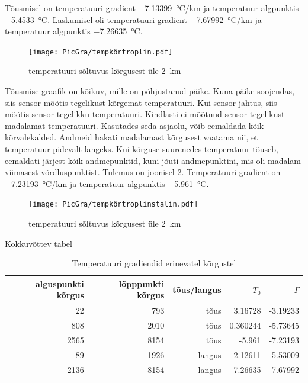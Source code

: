 \documentclass{trkut}%
\begin{document}
Tõusmisel on temperatuuri gradient \SI{-7.13399}{\degreeCelsius/km} ja temperatuur algpunktis \SI{-5.4533}{\celsius}. Laskumisel oli temperatuuri gradient \SI{-7.67992}{\degreeCelsius/km} ja temperatuur algpunktis \SI{-7.26635}{\celsius}.

\begin{figure}[h]
	\texttt{[image: PicGra/tempkõrtroplin.pdf]}
	\caption{temperatuuri sõltuvus kõrgusest üle \SI{2}{km}}
	\label{tempkõrtroplin}%
\end{figure}

Tõusmise graafik on kõikuv, mille on põhjustanud päike. Kuna päike soojendas, siis sensor mõõtis tegelikust kõrgemat temperatuuri. Kui sensor jahtus, siis mõõtis sensor tegelikku temperatuuri. Kindlasti ei mõõtnud sensor tegelikust madalamat temperatuuri. Kasutades seda asjaolu, võib eemaldada kõik kõrvalekalded. Andmeid hakati madalamast kõrgusest vaatama nii, et temperatuur pidevalt langeks. Kui kõrguse suurenedes temperatuur tõuseb, eemaldati järjest kõik andmepunktid, kuni jõuti andmepunktini, mis oli madalam viimasest võrdluspunktist. Tulemus on joonisel \ref{tempkõrtroplinstalin}. Temperatuuri gradient on \SI{-7.23193}{\degreeCelsius/km} ja temperatuur algpunktis \SI{-5.961}{\celsius}.

\begin{figure}[h]
	\texttt{[image: PicGra/tempkõrtroplinstalin.pdf]}
 	\caption{temperatuuri sõltuvus kõrgusest üle \SI{2}{km}}
 	\label{tempkõrtroplinstalin}%
\end{figure}

Kokkuvõttev tabel
\begin{table}[htb]
	\caption{Temperatuuri gradiendid erinevatel kõrgustel}
	\begin{tabular}{r|r|r|r|r}
		\hline
		alguspunkti kõrgus & lõpppunkti kõrgus & tõus/langus & $T_0$ & $\Gamma$ \\
		\hline
		22 & 793 & tõus & 3.16728 & -3.19233 \\
		808 & 2010 & tõus & 0.360244 & -5.73645 \\
		2565 & 8154 & tõus & -5.961 & -7.23193 \\
		89 & 1926 & langus & 2.12611 & -5.53009 \\
		2136 & 8154 & langus & -7.26635 & -7.67992
	\end{tabular}
\end{table}
\end{document}
